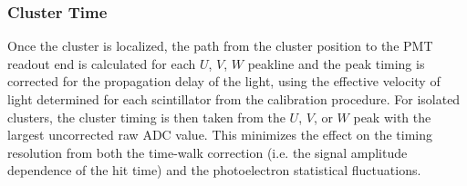 \subsubsection {Cluster Time}

Once the cluster is localized, the path from the cluster position to the PMT readout end is calculated for each
$U$, $V$, $W$ peakline and the peak timing is corrected for the propagation delay of the light, using the effective
velocity of light determined for each scintillator from the calibration procedure. For isolated clusters, the cluster
timing is then taken from the $U$, $V$, or $W$ peak with the largest uncorrected raw ADC value. This minimizes
the effect on the timing resolution from both the time-walk correction (i.e. the signal amplitude dependence of the
hit time) and the photoelectron statistical fluctuations.
